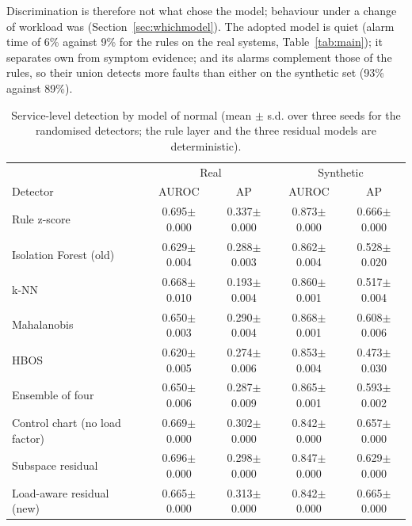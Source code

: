 Discrimination is therefore not what chose the model; behaviour under a change of workload was (Section~\ref{sec:whichmodel}). The adopted model is quiet (alarm time of 6\% against 9\% for the rules on the real systems, Table~\ref{tab:main}); it separates own from symptom evidence; and its alarms complement those of the rules, so their union detects more faults than either on the synthetic set (93\% against 89\%).

\begin{table}[!htbp]
\centering
\caption[Service-level detection by detector (mean $\pm$ s.d]{Service-level detection by model of normal (mean $\pm$ s.d. over three seeds for the randomised detectors; the rule layer and the three residual models are deterministic).}
\label{tab:roc}
\footnotesize
\begin{tabular}{lcccc}
\toprule
 & \multicolumn{2}{c}{Real} & \multicolumn{2}{c}{Synthetic} \\
Detector & AUROC & AP & AUROC & AP \\
\midrule
Rule z-score & 0.695$\pm$0.000 & 0.337$\pm$0.000 & 0.873$\pm$0.000 & 0.666$\pm$0.000 \\
Isolation Forest (old) & 0.629$\pm$0.004 & 0.288$\pm$0.003 & 0.862$\pm$0.004 & 0.528$\pm$0.020 \\
k-NN & 0.668$\pm$0.010 & 0.193$\pm$0.004 & 0.860$\pm$0.001 & 0.517$\pm$0.004 \\
Mahalanobis & 0.650$\pm$0.003 & 0.290$\pm$0.004 & 0.868$\pm$0.001 & 0.608$\pm$0.006 \\
HBOS & 0.620$\pm$0.005 & 0.274$\pm$0.006 & 0.853$\pm$0.004 & 0.473$\pm$0.030 \\
Ensemble of four & 0.650$\pm$0.006 & 0.287$\pm$0.009 & 0.865$\pm$0.001 & 0.593$\pm$0.002 \\
Control chart (no load factor) & 0.669$\pm$0.000 & 0.302$\pm$0.000 & 0.842$\pm$0.000 & 0.657$\pm$0.000 \\
Subspace residual & 0.696$\pm$0.000 & 0.298$\pm$0.000 & 0.847$\pm$0.000 & 0.629$\pm$0.000 \\
Load-aware residual (new) & 0.665$\pm$0.000 & 0.313$\pm$0.000 & 0.842$\pm$0.000 & 0.665$\pm$0.000 \\
\bottomrule
\end{tabular}
\end{table}

